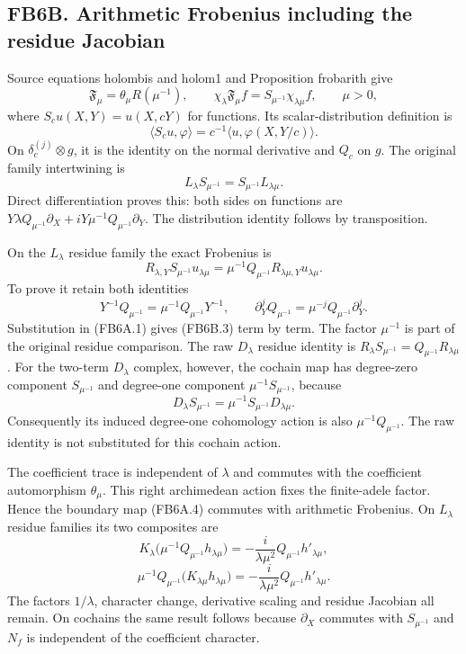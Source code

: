 \subsection{FB6B. Arithmetic Frobenius including the residue
Jacobian}\label{fb6b.-arithmetic-frobenius-including-the-residue-jacobian}

Source equations holombis and holom1 and Proposition frobarith give \[
\mathfrak F_\mu=\theta_\mu R(\mu^{-1}),\qquad
\chi_\lambda\mathfrak F_\mu f
=S_{\mu^{-1}}\chi_{\lambda\mu}f,\qquad \mu>0,
\] where \(S_cu(X,Y)=u(X,cY)\) for functions. Its scalar-distribution
definition is \[
\langle S_cu,\varphi\rangle
=c^{-1}\langle u,\varphi(X,Y/c)\rangle.
\tag{FB6B.1}
\] On \(\delta_c^{(j)}\otimes g\), it is the identity on the normal
derivative and \(Q_c\) on \(g\). The original family intertwining is \[
L_\lambda S_{\mu^{-1}}
=S_{\mu^{-1}}L_{\lambda\mu}.
\tag{FB6B.2}
\] Direct differentiation proves this: both sides on functions are
\(Y\lambda Q_{\mu^{-1}}\partial_X+
iY\mu^{-1}Q_{\mu^{-1}}\partial_Y\). The distribution identity follows by
transposition.

On the \(L_\lambda\) residue family the exact Frobenius is \[
R_{\lambda,Y}S_{\mu^{-1}}u_{\lambda\mu}
=\mu^{-1}Q_{\mu^{-1}}R_{\lambda\mu,Y}u_{\lambda\mu}.
\tag{FB6B.3}
\] To prove it retain both identities \[
Y^{-1}Q_{\mu^{-1}}=\mu^{-1}Q_{\mu^{-1}}Y^{-1},
\qquad
\partial_Y^jQ_{\mu^{-1}}
=\mu^{-j}Q_{\mu^{-1}}\partial_Y^j.
\] Substitution in (FB6A.1) gives (FB6B.3) term by term. The factor
\(\mu^{-1}\) is part of the original residue comparison. The raw
\(D_\lambda\) residue identity is
\(R_\lambda S_{\mu^{-1}}=Q_{\mu^{-1}}R_{\lambda\mu}\). For the two-term
\(D_\lambda\) complex, however, the cochain map has degree-zero
component \(S_{\mu^{-1}}\) and degree-one component
\(\mu^{-1}S_{\mu^{-1}}\), because \[
D_\lambda S_{\mu^{-1}}
=\mu^{-1}S_{\mu^{-1}}D_{\lambda\mu}.
\] Consequently its induced degree-one cohomology action is also
\(\mu^{-1}Q_{\mu^{-1}}\). The raw identity is not substituted for this
cochain action.

The coefficient trace is independent of \(\lambda\) and commutes with
the coefficient automorphism \(\theta_\mu\). This right archimedean
action fixes the finite-adele factor. Hence the boundary map (FB6A.4)
commutes with arithmetic Frobenius. On \(L_\lambda\) residue families
its two composites are \[
K_\lambda\bigl(\mu^{-1}Q_{\mu^{-1}}h_{\lambda\mu}\bigr)
=-\frac{i}{\lambda\mu^2}
Q_{\mu^{-1}}h'_{\lambda\mu},
\] \[
\mu^{-1}Q_{\mu^{-1}}\bigl(K_{\lambda\mu}h_{\lambda\mu}\bigr)
=-\frac{i}{\lambda\mu^2}
Q_{\mu^{-1}}h'_{\lambda\mu}.
\tag{FB6B.4}
\] The factors \(1/\lambda\), character change, derivative scaling and
residue Jacobian all remain. On cochains the same result follows because
\(\partial_X\) commutes with \(S_{\mu^{-1}}\) and \(N_f\) is independent
of the coefficient character.

